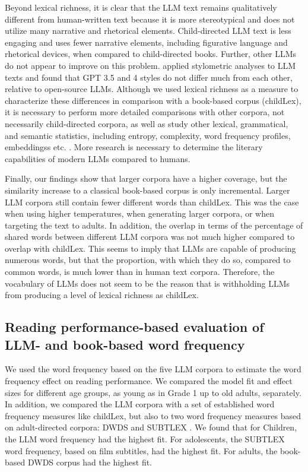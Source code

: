 \documentclass[doc, a4paper]{apa7}
\begin{document}
Beyond lexical richness, it is clear that the LLM text remains qualitatively different from human-written text because it is more stereotypical and does not utilize many narrative and rhetorical elements. Child-directed LLM text is less engaging and uses fewer narrative elements, including figurative language and rhetorical devices, when compared to child-directed books. Further, other LLMs do not appear to improve on this problem. \citet{kumarage_neural_2023} applied stylometric analyses to LLM texts and found that GPT 3.5 and 4 styles do not differ much from each other, relative to open-source LLMs. Although we used lexical richness as a measure to characterize these differences in comparison with a book-based corpus (childLex), it is necessary to perform more detailed comparisons with other corpora, not necessarily child-directed corpora, as well as study other lexical, grammatical, and semantic statistics, including entropy, complexity, word frequency profiles, embeddingss etc. \citep{hu_language_2024, dentella_systematic_2023, munoz-ortiz_contrasting_2024, wu_survey_2024}. More research is necessary to determine the literary capabilities of modern LLMs compared to humans. 

Finally, our findings show that larger corpora have a higher coverage, but the similarity increase to a classical book-based corpus is only incremental. Larger LLM corpora still contain fewer different words than childLex. This was the case when using higher temperatures, when generating larger corpora, or when targeting the text to adults. In addition, the overlap in terms of the percentage of shared words between different LLM corpora was not much higher compared to overlap with childLex. This seems to imply that LLMs are capable of producing numerous words, but that the proportion, with which they do so, compared to common words, is much lower than in human text corpora. Therefore, the vocabulary of LLMs does not seem to be the reason that is withholding LLMs from producing a level of lexical richness as childLex. 




\subsection*{Reading performance-based evaluation of LLM- and book-based word frequency}

We used the word frequency based on the five LLM corpora to estimate the word frequency effect on reading performance. We compared the model fit and effect sizes for different age groups, as young as in Grade 1 up to old adults, separately. In addition, we compared the LLM corpora with a set of established word frequency measures like childLex, but also to two word frequency measures based on adult-directed corpora: DWDS \citep{heister_dlexdb_2011} and SUBTLEX \citep{brysbaert_word_2011}. We found that for Children, the LLM word frequency had the highest fit. For adolescents, the SUBTLEX word frequency, based on film subtitles, had the highest fit. For adults, the book-based DWDS corpus had the highest fit. 
\end{document}
